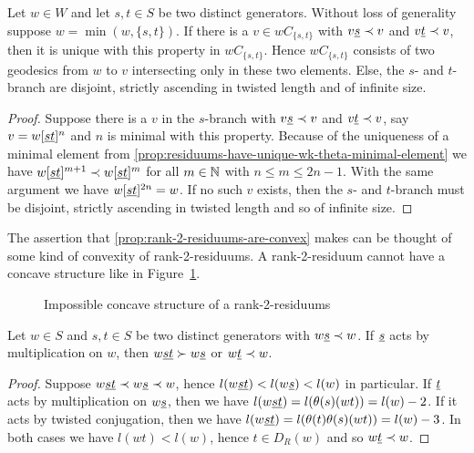 \begin{prop}
	Let $w \in W$ and let $s,t \in S$ be two distinct generators. Without loss of generality suppose $w = \min(w, \{s,t\})$. If there is a $v \in wC_{\{s,t\}}$ with $v \underline{s} \prec v$ and $v \underline{t} \prec v$, then it is unique with this property in $wC_{\{s,t\}}$. Hence $wC_{\{s,t\}}$ consists of two geodesics from $w$ to $v$ intersecting only in these two elements. Else, the $s$- and $t$-branch are disjoint, strictly ascending in twisted length and of infinite size.

	\begin{proof}
		Suppose there is a $v$ in the $s$-branch with $v \underline{s} \prec v$ and $v \underline{t} \prec v$, say $v = w[\underline{s} \underline{t}]^n$ and $n$ is minimal with this property. Because of the uniqueness of a minimal element from \ref{prop:residuums-have-unique-wk-theta-minimal-element} we have $w[\underline{s} \underline{t}]^{m+1} \prec w[\underline{s} \underline{t}]^m$ for all $m \in \mathbb{N}$ with $n \leq m \leq 2n - 1$. With the same argument we have $w[\underline{s} \underline{t}]^{2n} = w$. If no such $v$ exists, then the $s$- and $t$-branch must be disjoint, strictly ascending in twisted length and so of infinite size.
	\end{proof}
\end{prop}

The assertion that \ref{prop:rank-2-residuums-are-convex} makes can be thought of some kind of convexity of rank-2-residuums. A rank-2-residuum cannot have a concave structure like in Figure~\ref{fig:concave-rank-2-residuum}.

\begin{figure}[ht]
	\centering
	
	\caption{Impossible concave structure of a rank-2-residuums}
	\label{fig:concave-rank-2-residuum}
\end{figure}

\begin{prop}
	Let $w \in S$ and $s,t \in S$ be two distinct generators with $w \underline{s} \prec w$. If $\underline{s}$ acts by multiplication on $w$, then $w \underline{s} \underline{t} \succ w \underline{s}$ or $w \underline{t} \prec w$.

	\begin{proof}
		Suppose $w \underline{s} \underline{t} \prec w \underline{s} \prec w$, hence $l(w \underline{s} \underline{t}) < l(w \underline{s}) < l(w)$ in particular. If $\underline{t}$ acts by multiplication on $w \underline{s}$, then we have $l(w \underline{s} \underline{t}) = l(\theta(s)(wt)) = l(w) - 2$. If it acts by twisted conjugation, then we have $l(w \underline{s} \underline{t}) = l(\theta(t)\theta(s)(wt)) = l(w) - 3$. In both cases we have $l(wt) < l(w)$, hence $t \in D_R(w)$ and so $w \underline{t} \prec w$.
	\end{proof}
\end{prop}

